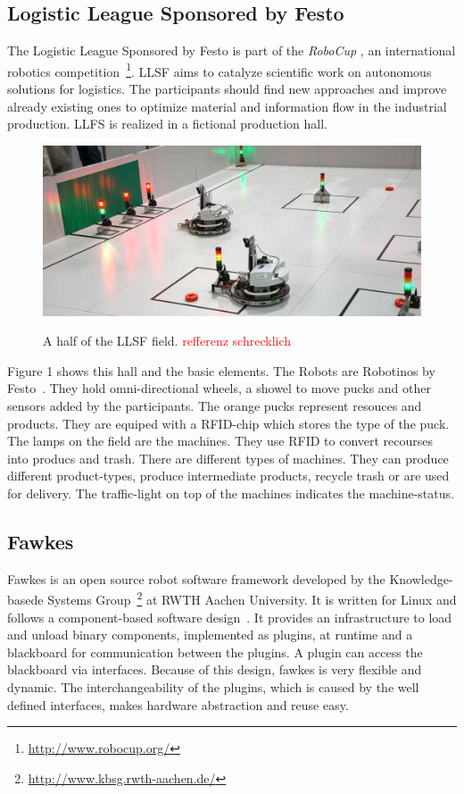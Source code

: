 \documentclass[11pt,a4paper,titlepage]{article}
\begin{document}
\subsection{Logistic League Sponsored by Festo}
The Logistic League Sponsored by Festo is part of the \textit{RoboCup
}, an international robotics competition~\footnote{\url{http://www.robocup.org/}}. LLSF aims to catalyze scientific work on autonomous solutions for logistics. The participants should find new approaches and improve already existing ones to optimize material and information flow in the industrial production. LLFS is realized in a fictional production hall. 
\begin{figure}
\includegraphics[scale=0.7]{pics/llsf1}
\label{Figure 1}
\caption{A half of the LLSF field.  \textcolor{red}{refferenz schrecklich~\cite{LLSFGermanOpen}}}
\end{figure}
Figure 1 shows this hall and the basic elements. The Robots are Robotinos by Festo~\cite{Robotino}. They hold omni-directional wheels, a showel to move pucks and other sensors added by the participants. The orange pucks represent resouces and products. They are equiped with a RFID-chip which stores the type of the puck. The lamps on the field are the machines. They use RFID to convert recourses into producs and trash. There are different types of machines. They can produce different product-types, produce intermediate products, recycle trash or are used for delivery. The traffic-light on top of the machines indicates the machine-status.
\subsection{Fawkes}
Fawkes is an open source robot software framework developed by the Knowledge-basede Systems Group~\footnote{\url{http://www.kbsg.rwth-aachen.de/}} at RWTH Aachen University. It is written for Linux and follows a component-based software design~\cite{FawkesDesign}. It provides an infrastructure to load and unload binary components, implemented as plugins, at runtime and a blackboard for communication between the plugins. A plugin can access the blackboard via interfaces. Because of this design, fawkes is very flexible and dynamic. The interchangeability of the plugins, which is caused by the well defined interfaces, makes hardware abstraction and reuse easy.\\
\end{document}
